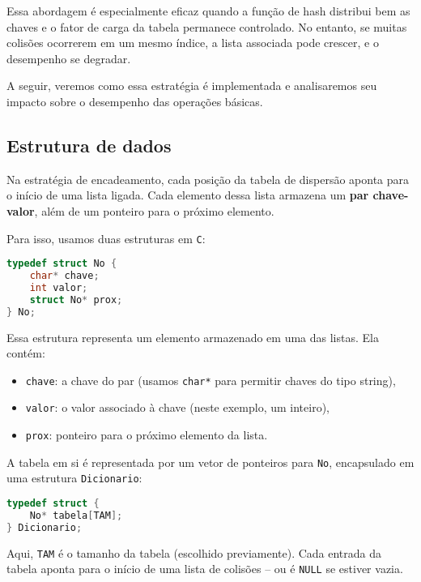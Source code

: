 Essa abordagem é especialmente eficaz quando a função de hash distribui bem as chaves e o fator de carga da tabela permanece controlado. 
No entanto, se muitas colisões ocorrerem em um mesmo índice, a lista associada pode crescer, e o desempenho se degradar.

A seguir, veremos como essa estratégia é implementada e analisaremos seu impacto sobre o desempenho das operações básicas.

\subsection*{Estrutura de dados}

Na estratégia de encadeamento, cada posição da tabela de dispersão aponta para o início de uma lista ligada. 
Cada elemento dessa lista armazena um \textbf{par chave-valor}, além de um ponteiro para o próximo elemento.

Para isso, usamos duas estruturas em \texttt{C}:

\begin{lstlisting}[language=C, caption={Estrutura de um nó da lista encadeada}]
typedef struct No {
    char* chave;
    int valor;
    struct No* prox;
} No;
\end{lstlisting}

Essa estrutura representa um elemento armazenado em uma das listas. 
Ela contém:

\begin{itemize}
  \item \texttt{chave}: a chave do par (usamos \texttt{char*} para permitir chaves do tipo string),
  \item \texttt{valor}: o valor associado à chave (neste exemplo, um inteiro),
  \item \texttt{prox}: ponteiro para o próximo elemento da lista.
\end{itemize}

A tabela em si é representada por um vetor de ponteiros para \texttt{No}, encapsulado em uma estrutura \texttt{Dicionario}:

\begin{lstlisting}[language=C, caption={Estrutura do dicionário com tabela de dispersão}]
typedef struct {
    No* tabela[TAM];
} Dicionario;
\end{lstlisting}

Aqui, \texttt{TAM} é o tamanho da tabela (escolhido previamente). 
Cada entrada da tabela aponta para o início de uma lista de colisões -- ou é \texttt{NULL} se estiver vazia.

